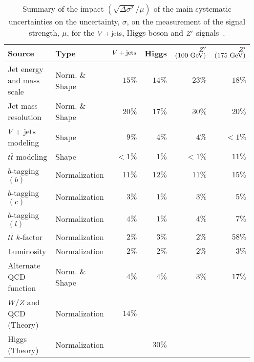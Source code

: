 \begin{table}[htpb]
 \centering
 \caption[Summary of the impact of the main systematic uncertainties on the signal strength uncertainties.]{%
  Summary of the impact $(\sqrt{\Delta \sigma^2}/\mu)$ of the main systematic uncertainties on the uncertainty, $\sigma$, on the measurement of the signal strength, $\mu$, for the $V + \text{jets}$, Higgs boson and $Z'$ signals~\cite{ATLAS-CONF-2018-052}.}
 \begin{tabular}{@{}llrrrr@{}}
  \toprule
  Source                    & Type           & $V + \text{jets}$ & Higgs  & $Z'$ $\left(100~\mathrm{GeV}\right)$ & $Z'$ $\left(175~\mathrm{GeV}\right)$ \\ \midrule
  Jet energy and mass scale & Norm. \& Shape & $15\%$   & $14\%$ & $23\%$                            & $18\%$                            \\
  Jet mass resolution       & Norm. \& Shape & $20\%$   & $17\%$ & $30\% $                           & $20\% $                           \\
  $V$ + jets modeling       & Shape          & $9\%$    & $4\%$  & $4\%$                             & $<1\%$                            \\
  $t\bar{t}$ modeling       & Shape          & $<1\%$   & $1\%$  & $<1\%$                            & $11\%$                            \\
  $b$-tagging $(b)$         & Normalization  & $11\%$   & $12\%$ & $11\%$                            & $15\%$                            \\
  $b$-tagging $(c)$         & Normalization  & $3\%$    & $1\%$  & $3\%$                             & $5\%$                             \\
  $b$-tagging $(l)$         & Normalization  & $4\%$    & $1\%$  & $4\%$                             & $7\%$                             \\
  $t\bar{t}$ $k$-factor     & Normalization  & $2\%$    & $3\%$  & $2\%$                             & $58\%$                            \\
  Luminosity                & Normalization  & $2\%$    & $2\%$  & $2\%$                             & $3\%$                             \\
  Alternate QCD function    & Norm. \& Shape & $4\%$    & $4\%$  & $3\%$                             & $17\%$                            \\
  $W$/$Z$ and QCD (Theory)  & Normalization  & $14\%$   &        &                                   &
  \\
  Higgs (Theory)            & Normalization  &          & $30\%$ &                                   &
  \\
  \bottomrule
 \end{tabular}
 \label{table:systematic_uncertainties}
\end{table}
